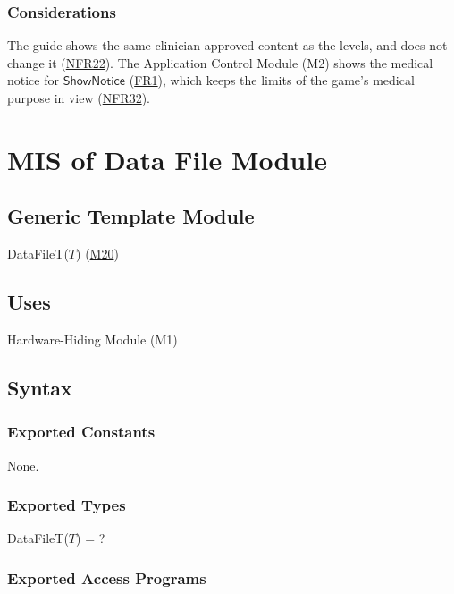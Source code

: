 \documentclass[10pt, titlepage]{article}
\newcommand{\srsurl}{https://team-hindsight.github.io/ophthamology-game/SRS/SRS.pdf}
\newcommand{\srsitemref}[2]{\href{\srsurl\#nameddest=#1}{#2}}
\newcommand{\misref}[2]{\hyperref[mis:#1]{M#2}}
\newcommand{\V}[1]{\mathsf{#1}}          %
\begin{document}
\subsubsection{Considerations}

The guide shows the same clinician-approved content as the levels, and does
not change it (\srsitemref{NFR_ClinicalAccuracy}{NFR22}). The Application
Control Module (M2) shows the medical notice for $\V{ShowNotice}$
(\srsitemref{FR_MedicalNotice}{FR1}), which keeps the limits of the game's
medical purpose in view (\srsitemref{NFR_NoClaims}{NFR32}).

\newpage
\section{MIS of Data File Module} \label{mis:DataFile}

\subsection{Generic Template Module}

DataFileT($T$) (\misref{DataFile}{20})

\subsection{Uses}

Hardware-Hiding Module (M1)

\subsection{Syntax}

\subsubsection{Exported Constants}

None.

\subsubsection{Exported Types}

DataFileT($T$) = ?

\subsubsection{Exported Access Programs}
\end{document}
